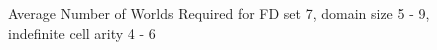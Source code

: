 \begin{figure}
\begin{minipage}{7cm}
\centerline{}
\caption{\label{graph:4.10w} {Average Number of Worlds
Required for FD set 5, domain size 5 - 9, indefinite cell arity 4 - 6}}
\end{minipage}
\hfill
\begin{minipage}{7cm}
\centerline{}
\caption{\label{graph:4.16w} {Average Number of Worlds
Required for FD set 7, domain size 5 - 9, indefinite cell arity 4 - 6}}
\end{minipage}
\end{figure}



